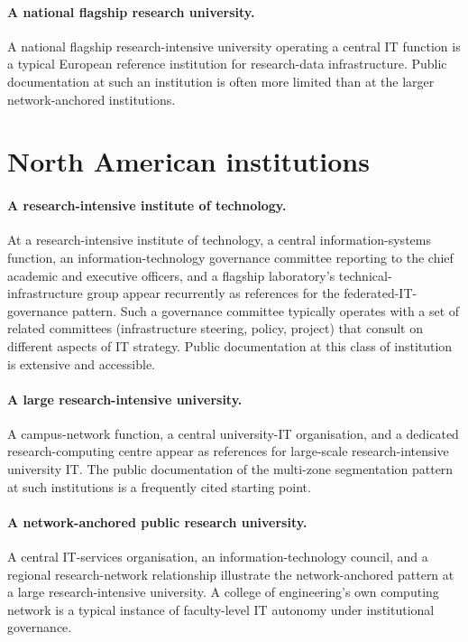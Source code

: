 \paragraph{A national flagship research university.} A national
flagship research-intensive university operating a central IT
function is a typical European reference institution for
research-data infrastructure. Public documentation at such an
institution is often more limited than at the larger
network-anchored institutions.

\section{North American institutions}
\label{sec:ip-north-america}

\paragraph{A research-intensive institute of technology.} At a
research-intensive institute of technology, a central
information-systems function, an information-technology governance
committee reporting to the chief academic and executive officers,
and a flagship laboratory's technical-infrastructure group appear
recurrently as references for the federated-IT-governance pattern.
Such a governance committee typically operates with a set of
related committees (infrastructure steering, policy, project) that
consult on different aspects of IT strategy. Public documentation
at this class of institution is extensive and accessible.

\paragraph{A large research-intensive university.} A
campus-network function, a central university-IT organisation, and
a dedicated research-computing centre appear as references for
large-scale research-intensive university IT. The public
documentation of the multi-zone segmentation pattern at such
institutions is a frequently cited starting point.

\paragraph{A network-anchored public research university.} A
central IT-services organisation, an information-technology
council, and a regional research-network relationship illustrate
the network-anchored pattern at a large research-intensive
university. A college of engineering's own computing network is a
typical instance of faculty-level IT autonomy under institutional
governance.

